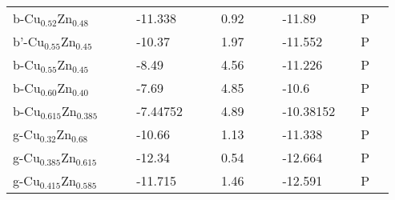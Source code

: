 \documentclass{article}
\begin{document}
\begin{center}
\begin{longtable}{|l|p{2.5cm}|l|p{2.5cm}|l|l|p{2.5cm}|l|l|p{2.5cm}|l|l|l|}
b-Cu$_{0.52}$Zn$_{0.48 }$    &                            &                   & -11.338             &     & \citep{KubaschewskiCatterallJohnAshley.1956} & 0.92               &     & \citep{KubaschewskiCatterallJohnAshley.1956} & -11.89                              &     & P                 \\
b'-Cu$_{0.55}$Zn$_{0.45}$    &                            &                   & -10.37              &     & \citep{KubaschewskiCatterallJohnAshley.1956} & 1.97               &     & \citep{KubaschewskiCatterallJohnAshley.1956} & -11.552                             &     & P                 \\
b-Cu$_{0.55}$Zn$_{0.45 }$    &                            &                   & -8.49               &     & \citep{KubaschewskiCatterallJohnAshley.1956} & 4.56               &     & \citep{KubaschewskiCatterallJohnAshley.1956} & -11.226                             &     & P                 \\
b-Cu$_{0.60}$Zn$_{0.40}$     &                            &                   & -7.69               &     & \citep{KubaschewskiCatterallJohnAshley.1956} & 4.85               &     & \citep{KubaschewskiCatterallJohnAshley.1956} & -10.6                               &     & P                 \\
b-Cu$_{0.615}$Zn$_{0.385 }$  &                            &                   & -7.44752            &     & \citep{KubaschewskiCatterallJohnAshley.1956} & 4.89               &     & \citep{KubaschewskiCatterallJohnAshley.1956} & -10.38152                           &     & P                 \\
g-Cu$_{0.32}$Zn$_{0.68}$     &                            &                   & -10.66              &     & \citep{KubaschewskiCatterallJohnAshley.1956} & 1.13               &     & \citep{KubaschewskiCatterallJohnAshley.1956} & -11.338                             &     & P                 \\
g-Cu$_{0.385}$Zn$_{0.615}$   &                            &                   & -12.34              &     & \citep{KubaschewskiCatterallJohnAshley.1956} & 0.54               &     & \citep{KubaschewskiCatterallJohnAshley.1956} & -12.664                             &     & P                 \\
g-Cu$_{0.415}$Zn$_{0.585 }$  &                            &                   & -11.715             &     & \citep{KubaschewskiCatterallJohnAshley.1956} & 1.46               &     & \citep{KubaschewskiCatterallJohnAshley.1956} & -12.591                             &     & P                 \\

\end{longtable}
\end{center}
\end{document}
